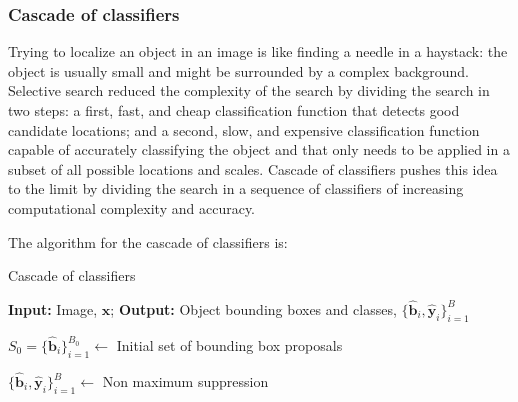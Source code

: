 

\subsubsection{Cascade of classifiers}
Trying to localize an object in an image is like finding a needle in a haystack: the object is usually small and might be surrounded by a complex background.
Selective search reduced the complexity of the search by dividing the search in two steps: a first, fast, and cheap classification function that detects good candidate locations; and a second, slow, and expensive classification function capable of accurately classifying the object and that only needs to be applied in a subset of all possible locations and scales. Cascade of classifiers pushes this idea to the limit by dividing the search in a sequence of classifiers of increasing computational complexity and accuracy.


The algorithm for the cascade of classifiers is:

\begin{algorithm}[h]
    \SetAlgoVlined
    \DontPrintSemicolon
    \caption{Cascade of classifiers}
    \faketablecaption{}
    \label{alg:cascade_classifier}
    {\bf Input:} Image, $\mathbf{x}$;
    {\bf Output:} Object bounding boxes and classes, $\{\hat{\mathbf{b}}_i, \hat{\mathbf{y}}_i\}_{i=1}^B$\;

    $S_0 = \{\hat{\mathbf{b}}_i\}_{i=1}^{B_0} \leftarrow$ Initial set of bounding box proposals\;

    $\{\hat{\mathbf{b}}_i, \hat{\mathbf{y}}_i\}_{i=1}^B \leftarrow$ Non maximum suppression\;
\end{algorithm}

